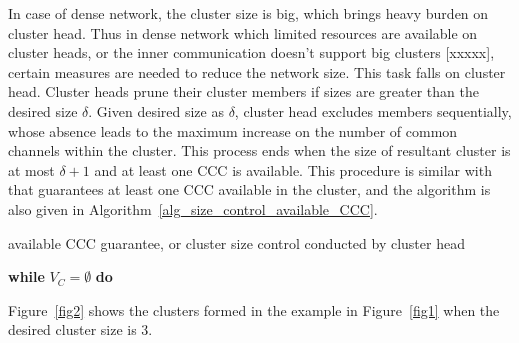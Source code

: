 In case of dense network, the cluster size is big, which brings heavy burden on cluster head.
Thus in dense network which limited resources are available on cluster heads, or the inner communication doesn't support big clusters [xxxxx], certain measures are needed to reduce the network size.
This task falls on cluster head.
Cluster heads prune their cluster members if sizes are greater than the desired size $\delta$.
Given desired size as $\delta$, cluster head excludes members sequentially, whose absence leads to the maximum increase on the number of common channels within the cluster.
This process ends when the size of resultant cluster is at most $\delta+1$ and at least one CCC is available.
This procedure is similar with that guarantees at least one CCC available in the cluster, and the algorithm is also given in Algorithm~\ref{alg_size_control_available_CCC}.


\begin{algorithm}               %
\caption{available CCC guarantee, or cluster size control conducted by cluster head}          %
\label{alg_size_control_available_CCC}
\DontPrintSemicolon
\SetAlgoLined
{}
\textbf{while} $V_C =\emptyset$ \textbf{do}\\
\end{algorithm}

Figure~\ref{fig2} shows the clusters formed in the example in Figure~\ref{fig1} when the desired cluster size is 3. 

